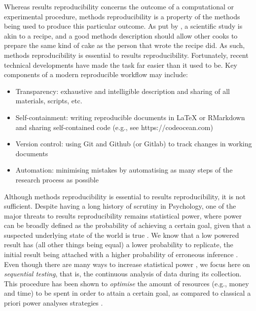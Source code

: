 \documentclass[a4paper,jou,natbib,floatsintext,donotrepeattitle]{apa6}
\begin{document}
Whereas results reproducibility concerns the outcome of a computational or experimental procedure, methods reproducibility is a property of the methods being used to produce this particular outcome. As put by \cite{meehl_appraising_1990}, a scientific study is akin to a recipe, and a good methods description should allow other cooks to prepare the same kind of cake as the person that wrote the recipe did. As such, methods reproducibility is essential to results reproducibility. Fortunately, recent technical developments have made the task far easier than it used to be. Key components of a modern reproducible workflow may include:

\begin{itemize}
  \item Transparency: exhaustive and intelligible description and sharing of all materials, scripts, etc. \citep[for a practical introduction, see][]{klein_practical_2018}
  \item Self-containment: writing reproducible documents in LaTeX or RMarkdown \citep[e.g., see the \texttt{R} package \texttt{papaja,}][]{Aust_papaja_2018} and sharing self-contained code (e.g., see https://codeocean.com)
  \item Version control: using Git and Github (or Gitlab) to track changes in working documents \citep[for an introduction, see][]{vuorre_curating_2018}
  \item Automation: minimising mistakes by automatising as many steps of the research process as possible \citep[e.g.,][]{rouder_what_2016, rouder_minimizing_2018,yarkoni_enhancing_2019}
\end{itemize}

Although methods reproducibility is essential to results reproducibility, it is not sufficient. Despite having a long history of scrutiny in Psychology, one of the major threats to results reproducibility remains statistical power, where power can be broadly defined as the probability of achieving a certain goal, given that a suspected underlying state of the world is true \citep{kruschke_doing_2015}. We know that a low powered result has (all other things being equal) a lower probability to replicate, the initial result being attached with a higher probability of erroneous inference \citep[e.g.,  type-M or type-S errors,][]{gelman_beyond_2014}. Even though there are many ways to increase statistical power \citep[e.g., see][]{hansen_seven_1994}, we focus here on \textit{sequential testing}, that is, the continuous analysis of data during its collection. This procedure has been shown to \textit{optimise} the amount of resources (e.g., money and time) to be spent in order to attain a certain goal, as compared to classical a priori power analyses strategies \citep{lakens_performing_2014,schonbrodt_sequential_2017}.
\end{document}
